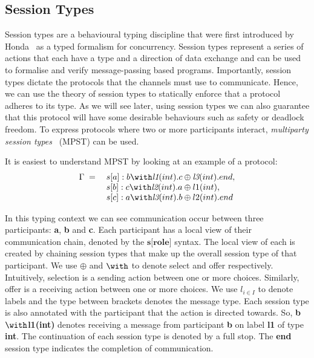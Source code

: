 \subsection{Session Types}

Session types are a behavioural typing discipline that were first introduced by Honda~\cite{H93} as a typed formalism for concurrency.
Session types represent a series of actions that each have a type and a direction of data exchange and can be used to formalise and verify message-passing based programs.
Importantly, session types dictate the protocols that the channels must use to communicate.
Hence, we can use the theory of session types to statically enforce that a protocol adheres to its type.
As we will see later, using session types we can also guarantee that this protocol will have some desirable behaviours such as safety or deadlock freedom.
To express protocols where two or more participants interact, \textit{multiparty session types}~\cite{SY19} (MPST) can be used. 

It is easiest to understand MPST by looking at an example of a protocol:
\begin{equation}
    \label{eqn:mpst_example}
    \begin{array}{rl}
        \textbf{\ensuremath{\Gamma}} \; = \;  & s[a]:b\ensuremath{\with}\textit{l1}(int).c\ensuremath{\oplus}\textit{l3}(int).end, \cr
        & s[b]:c\ensuremath{\with}\textit{l2}(int).a\ensuremath{\oplus}l1(int), \cr
        & s[c]:a\ensuremath{\with}\textit{l3}(int).b\ensuremath{\oplus}l2(int).end
    \end{array}
\end{equation}

In this typing context we can see communication occur between three participants: \textbf{a}, \textbf{b} and \textbf{c}.
Each participant has a local view of their communication chain, denoted by the \ensuremath{\textbf{s[role]}} syntax.
The local view of each is created by chaining session types that make up the overall session type of that participant.
We use \ensuremath{\oplus} and \ensuremath{\with} to denote select and offer respectively.
Intuitively, selection is a sending action between one or more choices.
Similarly, offer is a receiving action between one or more choices.
We use \ensuremath{l_{i \in I}} to denote labels and the type between brackets denotes the message type.
Each session type is also annotated with the participant that the action is directed towards.
So, \textbf{b\ensuremath{\with}l1(int)} denotes receiving a message from participant \textbf{b} on label \textbf{l1} of type \textbf{int}.
The continuation of each session type is denoted by a full stop.
The \textbf{end} session type indicates the completion of communication.

